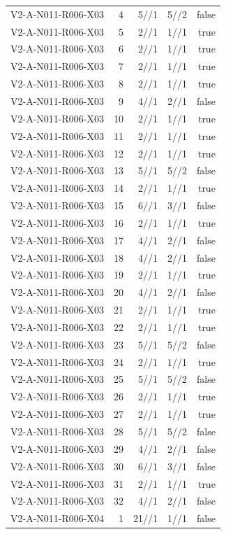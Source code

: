 {\begin{longtable}{lrrrr}
V2-A-N011-R006-X03 & 4 & 5//1 & 5//2 & false \\
V2-A-N011-R006-X03 & 5 & 2//1 & 1//1 & true \\
V2-A-N011-R006-X03 & 6 & 2//1 & 1//1 & true \\
V2-A-N011-R006-X03 & 7 & 2//1 & 1//1 & true \\
V2-A-N011-R006-X03 & 8 & 2//1 & 1//1 & true \\
V2-A-N011-R006-X03 & 9 & 4//1 & 2//1 & false \\
V2-A-N011-R006-X03 & 10 & 2//1 & 1//1 & true \\
V2-A-N011-R006-X03 & 11 & 2//1 & 1//1 & true \\
V2-A-N011-R006-X03 & 12 & 2//1 & 1//1 & true \\
V2-A-N011-R006-X03 & 13 & 5//1 & 5//2 & false \\
V2-A-N011-R006-X03 & 14 & 2//1 & 1//1 & true \\
V2-A-N011-R006-X03 & 15 & 6//1 & 3//1 & false \\
V2-A-N011-R006-X03 & 16 & 2//1 & 1//1 & true \\
V2-A-N011-R006-X03 & 17 & 4//1 & 2//1 & false \\
V2-A-N011-R006-X03 & 18 & 4//1 & 2//1 & false \\
V2-A-N011-R006-X03 & 19 & 2//1 & 1//1 & true \\
V2-A-N011-R006-X03 & 20 & 4//1 & 2//1 & false \\
V2-A-N011-R006-X03 & 21 & 2//1 & 1//1 & true \\
V2-A-N011-R006-X03 & 22 & 2//1 & 1//1 & true \\
V2-A-N011-R006-X03 & 23 & 5//1 & 5//2 & false \\
V2-A-N011-R006-X03 & 24 & 2//1 & 1//1 & true \\
V2-A-N011-R006-X03 & 25 & 5//1 & 5//2 & false \\
V2-A-N011-R006-X03 & 26 & 2//1 & 1//1 & true \\
V2-A-N011-R006-X03 & 27 & 2//1 & 1//1 & true \\
V2-A-N011-R006-X03 & 28 & 5//1 & 5//2 & false \\
V2-A-N011-R006-X03 & 29 & 4//1 & 2//1 & false \\
V2-A-N011-R006-X03 & 30 & 6//1 & 3//1 & false \\
V2-A-N011-R006-X03 & 31 & 2//1 & 1//1 & true \\
V2-A-N011-R006-X03 & 32 & 4//1 & 2//1 & false \\
V2-A-N011-R006-X04 & 1 & 21//1 & 1//1 & false \\

\end{longtable}}
